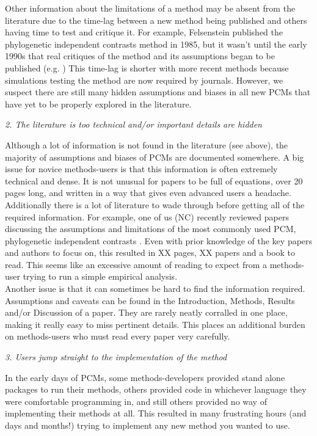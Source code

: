 \documentclass[a4paper,12pt]{article}
\renewcommand{\subsection}[1]{
  \bigskip
  \begin{center}
  \begin{large}
  \normalfont\itshape #1
  \end{large}
  \end{center}
}
\begin{document}
Other information about the limitations of a method may be absent from the literature due to the time-lag between a new method being published and others having time to test and critique it. 
For example, Felsenstein published the phylogenetic independent contrasts method in 1985, but it wasn't until the early 1990s that real critiques of the method and its assumptions began to be published (e.g. \citealp{garland1992procedures})
This time-lag is shorter with more recent methods because simulations testing the method are now required by journals.
However, we suspect there are still many hidden assumptions and biases in all new PCMs that have yet to be properly explored in the literature. 

\subsection{2. The literature is too technical and/or important details are hidden}
Although a lot of information is not found in the literature (see above), the majority of assumptions and biases of PCMs are documented somewhere. 
A big issue for novice methods-users is that this information is often extremely technical and dense.
It is not unusual for papers to be full of equations, over 20 pages long, and written in a way that gives even advanced users a headache. 
Additionally there is a lot of literature to wade through before getting all of the required information. 
For example, one of us (NC) recently reviewed papers discussing the assumptions and limitations of the most commonly used PCM, phylogenetic independent contrasts \citep{felsenstein1985phylogenies}. 
Even with prior knowledge of the key papers and authors to focus on, this resulted in XX pages, XX papers and a book to read. %
This seems like an excessive amount of reading to expect from a methods-user trying to run a simple empirical analysis.\\

Another issue is that it can sometimes be hard to find the information required. Assumptions and caveats can be found in the Introduction, Methods, Results and/or Discussion of a paper. 
They are rarely neatly corralled in one place, making it really easy to miss pertinent details. 
This places an additional burden on methods-users who must read every paper very carefully.

\subsection{3. Users jump straight to the implementation of the method}
In the early days of PCMs, some methods-developers provided stand alone packages to run their methods, others provided code in whichever language they were comfortable programming in, and still others provided no way of implementing their methods at all. 
This resulted in many frustrating hours (and days and months!) trying to implement any new method you wanted to use.\\
\end{document}

